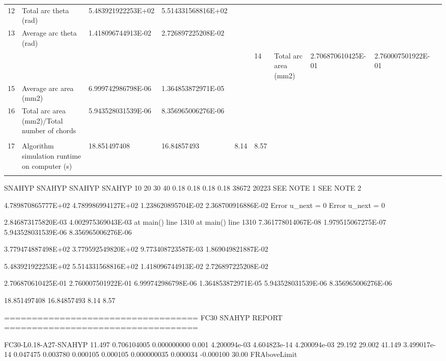 \begin{tabular}{ p{0.5cm} p{8.0cm} p{4.00cm} p{4.0cm} p{4.00cm} p{4.0cm}}
12	& Total arc theta (rad)	                               & 5.483921922253E+02	& 5.514331568816E+02   &    & \\
13	& Average arc theta (rad)	                           & 1.418096744913E-02	& 2.726897225208E-02   & 	& \\
	&                                                      &                    &                      &                    & 
14	& Total arc area (mm2)	                               & 2.706870610425E-01	& 2.760007501922E-01   &    & \\
15	& Average arc area (mm2)	                           & 6.999742986798E-06	& 1.364853872971E-05   & 	& \\
16	& Total arc area (mm2)/Total number of chords	       & 5.943528031539E-06	& 8.356965006276E-06   & 	& \\
	&                                                      &                    &                      &    & \\
17	& Algorithm simulation runtime on computer (s)         & 18.851497408	    & 16.84857493	       & 8.14  & 8.57 \\
	&                                                      &                    &                      &                    & 
\end{tabular}

SNAHYP	SNAHYP	SNAHYP	SNAHYP
10	20	30	40
0.18	0.18	0.18	0.18
38672	20223	SEE NOTE 1	SEE NOTE 2


4.789870865777E+02	4.789986994127E+02		
1.238620895704E-02	2.368700916886E-02	Error u_next = 0	Error u_next = 0

2.846873175820E-03	4.002975369043E-03	at main() line 1310	at main() line 1310
7.361778014067E-08	1.979515067275E-07		
5.943528031539E-06	8.356965006276E-06		

3.779474887498E+02	3.779592549820E+02	
9.773408723587E-03	1.869049821887E-02		

5.483921922253E+02	5.514331568816E+02		
1.418096744913E-02	2.726897225208E-02
		
2.706870610425E-01	2.760007501922E-01		
6.999742986798E-06	1.364853872971E-05		
5.943528031539E-06	8.356965006276E-06		

18.851497408	16.84857493	8.14	8.57


===================================
FC30 SNAHYP REPORT
===================================

FC30-L0.18-A27-SNAHYP  11.497  0.706104005  0.000000000  0.001 4.200094e-03  4.604823e-14  4.200094e-03   29.192  29.002  41.149  3.499017e-14   0.047475   0.003780   0.000105   0.000105  0.000000035   0.000034  -0.000100  30.00 FRAboveLimit 


